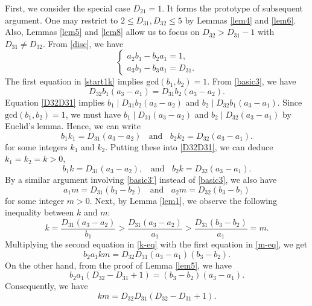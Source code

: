 \documentclass[12pt]{article}
\begin{document}
First, we consider the special case $D_{21} = 1$. It forms the prototype of subsequent argument. One may restrict to $2 \le D_{31}, D_{32} \le 5$ by Lemmas \ref{lem4} and \ref{lem6}. Also, Lemmas \ref{lem5} and \ref{lem8} allow us to focus on $D_{32} > D_{31} - 1$ with $D_{31} \neq D_{32}$. From \eqref{disc}, we have
\begin{equation} \label{start1k}
\left\{ \begin{array}{l} a_2 b_1 - b_2 a_1 = 1, \\
a_3 b_1 - b_3 a_1 = D_{31}.
\end{array} \right.
\end{equation}
The first equation in \eqref{start1k} implies $\text{gcd}(b_1, b_2) = 1$. From \eqref{basic3}, we have
\begin{equation} \label{D32D31}
D_{32} b_1 (a_3 - a_1) = D_{31} b_2 (a_3 - a_2).
\end{equation}
Equation \eqref{D32D31} implies $b_1 \mid D_{31} b_2 (a_3 - a_2)$ and $b_2 \mid D_{32} b_1 (a_3 - a_1)$. Since $\text{gcd}(b_1, b_2) = 1$, we must have $b_1 \mid D_{31} (a_3 - a_2)$ and $b_2 \mid D_{32} (a_3 - a_1)$ by Euclid's lemma. Hence, we can write
\[
b_1 k_1 = D_{31} (a_3 - a_2) \; \; \text{ and } \; \; b_2 k_2 = D_{32} (a_3 - a_1).
\]
for some integers $k_1$ and $k_2$. Putting these into \eqref{D32D31}, we can deduce $k_1 = k_2 = k > 0$,
\begin{equation} \label{k-eq}
b_1 k = D_{31} (a_3 - a_2), \; \; \text{ and } \; \; b_2 k = D_{32} (a_3 - a_1).
\end{equation}
By a similar argument involving \eqref{basic3'} instead of \eqref{basic3}, we also have
\begin{equation} \label{m-eq}
a_1 m = D_{31} (b_3 - b_2) \; \; \text{ and } \; \; a_2 m = D_{32} (b_3 - b_1)
\end{equation}
for some integer $m > 0$. Next, by Lemma \ref{lem1}, we observe the following inequality between $k$ and $m$:
\begin{equation} \label{km-ineq-1}
k = \frac{D_{31} (a_3 - a_2)}{b_1} > \frac{D_{31} (a_3 - a_2)}{a_1} > \frac{D_{31}(b_3-b_2)}{a_1}=m.
\end{equation}
Multiplying the second equation in \eqref{k-eq} with the first equation in \eqref{m-eq}, we get
\[
b_2 a_1 k m = D_{32} D_{31} (a_3 - a_1) (b_3 - b_2).
\]
On the other hand, from the proof of Lemma \ref{lem5}, we have
\[
b_2 a_1 (D_{32} - D_{31} + 1) = (b_3 - b_2)(a_3 - a_1).
\]
Consequently, we have
\begin{equation} \label{km}
k m = D_{32} D_{31} (D_{32} - D_{31} + 1).
\end{equation}
\end{document}
